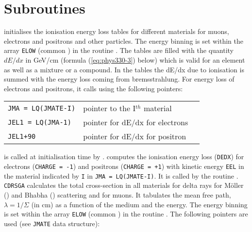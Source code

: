  

\section{Subroutines}
 initialises the ionisation energy loss tables for different
materials for muons, electrons and positrons and other particles.
The energy binning is set within the array
{\tt ELOW} (common ) in the routine .
The tables are filled with the quantity $dE/dx$ in GeV/cm (formula 
(\ref{eq:phys330-3}) below)
which is valid for an element as well as a mixture or a compound.
In the tables the dE/dx due to ionisation is summed with the
energy loss coming from bremsstrahlung.
For energy loss of electrons and positrons, it calls 
using the following pointers:

\begin{tabular}{llr}
 \mbox{\tt JMA = LQ(JMATE-I)} &  pointer to the I$^{th}$ material \\
 \mbox{\tt JEL1 = LQ(JMA-1) } &  pointer for dE/dx for electrons  \\
 \mbox{\tt JEL1+90          } &  pointer for dE/dx for positron \\
\end{tabular}

 is called at initialisation time by .
 computes the ionisation energy loss ({\tt DEDX}) for electrons 
({\tt CHARGE = -1}) and positrons ({\tt CHARGE = +1}) with kinetic
energy {\tt EEL} in the material indicated by {\tt I} in  
{\tt JMA = LQ(JMATE-I)}. It is called by the routine .
{\tt CDRSGA} calculates the total cross-section in all materials for
delta rays for M\"{o}ller (\Pem\Pem) and Bhabha (\Pem\Pep)
scattering and for muons. 
It tabulates the mean free path, $ \lambda = 1/\Sigma $ (in cm) 
as a function of the medium and the energy.
The energy binning is set within the array {\tt ELOW} (common
)
in the routine . The following
pointers are used (see {\tt JMATE} data structure):
 
